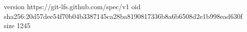 version https://git-lfs.github.com/spec/v1
oid sha256:20d57dee54f70b04b3387145ca28ba8190817336b8a6b6508d2e1b998ead630f
size 1245
